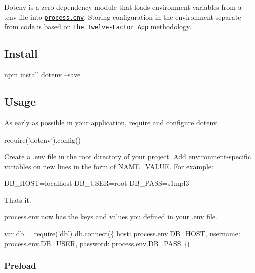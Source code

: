 

Dotenv is a zero-\/dependency module that loads environment variables from a {\ttfamily .env} file into \href{https://nodejs.org/docs/latest/api/process.html#process_process_env}{\tt {\ttfamily process.\+env}}. Storing configuration in the environment separate from code is based on \href{http://12factor.net/config}{\tt The Twelve-\/\+Factor App} methodology.

\href{https://travis-ci.org/motdotla/dotenv}{\tt } \href{https://www.npmjs.com/package/dotenv}{\tt } \href{https://github.com/feross/standard}{\tt } \href{https://coveralls.io/github/motdotla/dotenv?branch=coverall-intergration}{\tt }

\subsection*{Install}


\begin{DoxyCode}
npm install dotenv --save
\end{DoxyCode}


\subsection*{Usage}

As early as possible in your application, require and configure dotenv.


\begin{DoxyCode}
require('dotenv').config()
\end{DoxyCode}


Create a {\ttfamily .env} file in the root directory of your project. Add environment-\/specific variables on new lines in the form of {\ttfamily N\+A\+ME=V\+A\+L\+UE}. For example\+:


\begin{DoxyCode}
DB\_HOST=localhost
DB\_USER=root
DB\_PASS=s1mpl3
\end{DoxyCode}


That\textquotesingle{}s it.

{\ttfamily process.\+env} now has the keys and values you defined in your {\ttfamily .env} file.


\begin{DoxyCode}
var db = require('db')
db.connect(\{
  host: process.env.DB\_HOST,
  username: process.env.DB\_USER,
  password: process.env.DB\_PASS
\})
\end{DoxyCode}


\subsubsection*{Preload}

